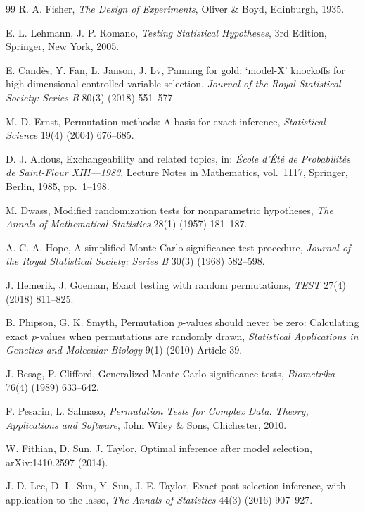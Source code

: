 \documentclass[preprint,12pt]{elsarticle}
\theoremstyle{definition}
\begin{document}
\begin{thebibliography}{99}
R. A. Fisher, \emph{The Design of Experiments}, Oliver \& Boyd, Edinburgh, 1935.

E. L. Lehmann, J. P. Romano, \emph{Testing Statistical Hypotheses}, 3rd Edition, Springer, New York, 2005.

E. Cand\`es, Y. Fan, L. Janson, J. Lv, Panning for gold: `model-X' knockoffs for high dimensional controlled variable selection,
\emph{Journal of the Royal Statistical Society: Series B} 80(3) (2018) 551--577.

M. D. Ernst, Permutation methods: A basis for exact inference,
\emph{Statistical Science} 19(4) (2004) 676--685.

D. J. Aldous, Exchangeability and related topics, in: \emph{\'Ecole d'\'Et\'e de Probabilit\'es de Saint-Flour XIII---1983}, Lecture Notes in Mathematics, vol.~1117, Springer, Berlin, 1985, pp.~1--198.

M. Dwass, Modified randomization tests for nonparametric hypotheses,
\emph{The Annals of Mathematical Statistics} 28(1) (1957) 181--187.

A. C. A. Hope, A simplified Monte Carlo significance test procedure,
\emph{Journal of the Royal Statistical Society: Series B} 30(3) (1968) 582--598.

J. Hemerik, J. Goeman, Exact testing with random permutations,
\emph{TEST} 27(4) (2018) 811--825.

B. Phipson, G. K. Smyth, Permutation $p$-values should never be zero: Calculating exact $p$-values when permutations are randomly drawn,
\emph{Statistical Applications in Genetics and Molecular Biology} 9(1) (2010) Article 39.

J. Besag, P. Clifford, Generalized Monte Carlo significance tests,
\emph{Biometrika} 76(4) (1989) 633--642.

F. Pesarin, L. Salmaso, \emph{Permutation Tests for Complex Data: Theory, Applications and Software}, John Wiley \& Sons, Chichester, 2010.

W. Fithian, D. Sun, J. Taylor, Optimal inference after model selection,
arXiv:1410.2597 (2014).

J. D. Lee, D. L. Sun, Y. Sun, J. E. Taylor, Exact post-selection inference, with application to the lasso,
\emph{The Annals of Statistics} 44(3) (2016) 907--927.


\end{thebibliography}
\end{document}

